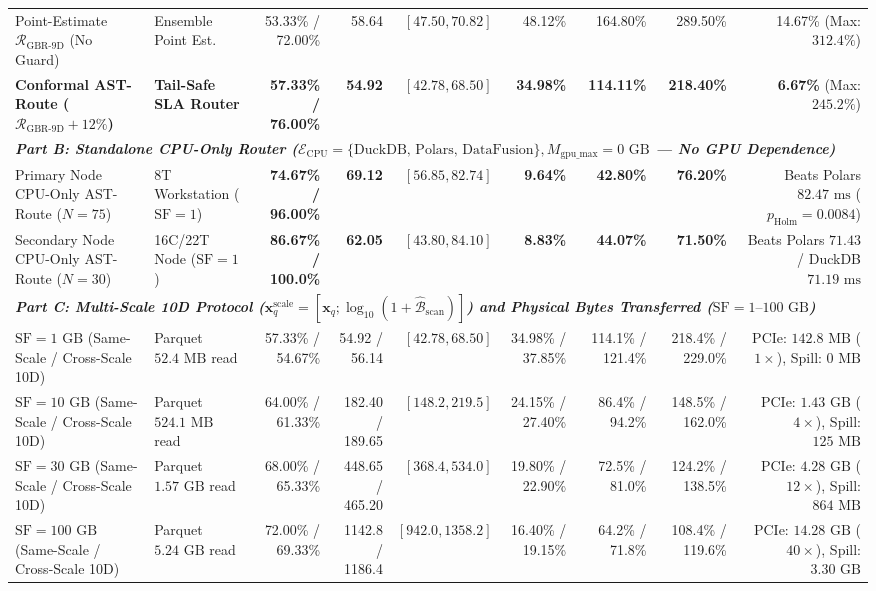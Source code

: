 \documentclass[10pt,a4paper]{article}
\begin{document}
\begin{table}[t!]
{\begin{tabular}{llrrrrrrr}
Point-Estimate $\mathcal{R}_{\text{GBR-9D}}$ (No Guard) & Ensemble Point Est. & 53.33\% / 72.00\% & 58.64 & $[47.50, 70.82]$ & 48.12\% & 164.80\% & 289.50\% & 14.67\% (Max: $312.4\%$) \\
\textbf{Conformal AST-Route ($\mathcal{R}_{\text{GBR-9D}}+12\%$)} & \textbf{Tail-Safe SLA Router} & \textbf{57.33\% / 76.00\%} & \textbf{54.92} & $[42.78, 68.50]$ & \textbf{34.98\%} & \textbf{114.11\%} & \textbf{218.40\%} & \textbf{6.67\%} (Max: $245.2\%$) \\
\hline
\multicolumn{9}{l}{\textit{\textbf{Part B: Standalone CPU-Only Router ($\mathcal{E}_{\text{CPU}}=\{\text{DuckDB, Polars, DataFusion}\}, M_{\text{gpu\_max}}=0\text{ GB}$ --- No GPU Dependence)}}} \\
Primary Node CPU-Only AST-Route ($N=75$) & 8T Workstation ($\text{SF}=1$) & \textbf{74.67\% / 96.00\%} & \textbf{69.12} & $[56.85, 82.74]$ & \textbf{9.64\%} & \textbf{42.80\%} & \textbf{76.20\%} & Beats Polars $82.47\text{ ms}$ ($p_{\text{Holm}}=0.0084$) \\
Secondary Node CPU-Only AST-Route ($N=30$) & 16C/22T Node ($\text{SF}=1$) & \textbf{86.67\% / 100.0\%} & \textbf{62.05} & $[43.80, 84.10]$ & \textbf{8.83\%} & \textbf{44.07\%} & \textbf{71.50\%} & Beats Polars $71.43$ / DuckDB $71.19\text{ ms}$ \\
\hline
\multicolumn{9}{l}{\textit{\textbf{Part C: Multi-Scale 10D Protocol ($\mathbf{x}_q^{\text{scale}}=[\mathbf{x}_q; \log_{10}(1+\hat{\mathcal{B}}_{\text{scan}})]$) and Physical Bytes Transferred ($\text{SF}=1\text{--}100\text{ GB}$)}}} \\
$\text{SF}=1\text{ GB}$ (Same-Scale / Cross-Scale 10D) & Parquet $52.4\text{ MB}$ read & 57.33\% / 54.67\% & 54.92 / 56.14 & $[42.78, 68.50]$ & 34.98\% / 37.85\% & 114.1\% / 121.4\% & 218.4\% / 229.0\% & PCIe: $142.8\text{ MB}$ ($1\times$), Spill: $0\text{ MB}$ \\
$\text{SF}=10\text{ GB}$ (Same-Scale / Cross-Scale 10D) & Parquet $524.1\text{ MB}$ read & 64.00\% / 61.33\% & 182.40 / 189.65 & $[148.2, 219.5]$ & 24.15\% / 27.40\% & 86.4\% / 94.2\% & 148.5\% / 162.0\% & PCIe: $1.43\text{ GB}$ ($4\times$), Spill: $125\text{ MB}$ \\
$\text{SF}=30\text{ GB}$ (Same-Scale / Cross-Scale 10D) & Parquet $1.57\text{ GB}$ read & 68.00\% / 65.33\% & 448.65 / 465.20 & $[368.4, 534.0]$ & 19.80\% / 22.90\% & 72.5\% / 81.0\% & 124.2\% / 138.5\% & PCIe: $4.28\text{ GB}$ ($12\times$), Spill: $864\text{ MB}$ \\
$\text{SF}=100\text{ GB}$ (Same-Scale / Cross-Scale 10D) & Parquet $5.24\text{ GB}$ read & 72.00\% / 69.33\% & 1142.8 / 1186.4 & $[942.0, 1358.2]$ & 16.40\% / 19.15\% & 64.2\% / 71.8\% & 108.4\% / 119.6\% & PCIe: $14.28\text{ GB}$ ($40\times$), Spill: $3.30\text{ GB}$ \\

\end{tabular}}
\end{table}
\end{document}
